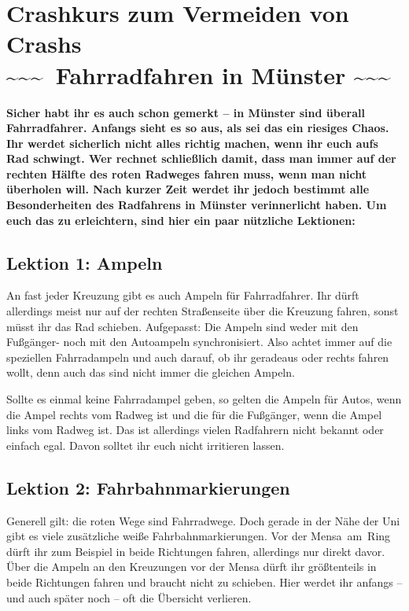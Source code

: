 
\section[Fahrradfahren in Münster]{Crashkurs zum Vermeiden von Crashs\\\textasciitilde\textasciitilde\textasciitilde\ Fahrradfahren in Münster \textasciitilde\textasciitilde\textasciitilde}
\begin{multicols}{2}
\textbf{Sicher habt ihr es auch schon gemerkt -- in Münster sind überall Fahrradfahrer. Anfangs sieht es so aus, als sei das ein riesiges Chaos. Ihr werdet sicherlich nicht alles richtig machen, wenn ihr euch aufs Rad schwingt. Wer rechnet schließlich damit, dass man immer auf der rechten Hälfte des roten Radweges fahren muss, wenn man nicht überholen will. Nach kurzer Zeit werdet ihr jedoch bestimmt alle Besonderheiten des Radfahrens in Münster verinnerlicht haben. Um euch das zu erleichtern, sind hier ein paar nützliche Lektionen:} 

\subsection*{Lektion 1: Ampeln}
An fast jeder Kreuzung gibt es auch Ampeln für Fahrradfahrer. Ihr dürft allerdings meist nur auf der rechten Straßenseite über die Kreuzung fahren, sonst müsst ihr das Rad schieben. Aufgepasst: Die Ampeln sind weder mit den Fußgänger- noch mit den Autoampeln synchronisiert. Also achtet immer auf die speziellen Fahrradampeln und auch darauf, ob ihr geradeaus oder rechts fahren wollt, denn auch das sind nicht immer die gleichen Ampeln.

Sollte es einmal keine Fahrradampel geben, so gelten die Ampeln für Autos, wenn die Ampel rechts vom Radweg ist und die für die Fußgänger, wenn die Ampel links vom Radweg ist. Das ist allerdings vielen Radfahrern nicht bekannt oder einfach egal. Davon solltet ihr euch nicht irritieren lassen.

\subsection*{Lektion 2: Fahrbahnmarkierungen}
Generell gilt: die roten Wege sind Fahrradwege. Doch gerade in der Nähe der Uni gibt es viele zusätzliche weiße Fahrbahnmarkierungen. Vor der Mensa~am~Ring dürft ihr zum Beispiel in beide Richtungen fahren, allerdings nur direkt davor. Über die Ampeln an den Kreuzungen vor der Mensa dürft ihr größtenteils in beide Richtungen fahren und braucht nicht zu schieben. Hier werdet ihr anfangs -- und auch später noch -- oft die Übersicht verlieren.


\end{multicols}
